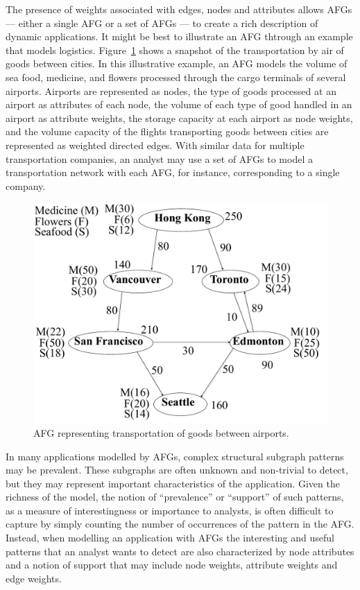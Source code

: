 The presence of weights associated with edges, nodes and attributes allows AFGs --- either a single AFG or a set of AFGs --- to create a rich description of dynamic applications. It might be best to illustrate an AFG thtrough an example that models logistics. Figure~\ref{fig:Airport} shows a snapshot of the transportation by air of goods between cities. In this illustrative example, an AFG models the volume of sea food, medicine, and flowers processed through the cargo terminals of several airports. Airports are represented as nodes, the type of goods processed at an airport as attributes of each node, the volume of each type of good handled in an airport as attribute weights, the storage capacity at each airport as node weights, and the volume capacity of the flights transporting goods between cities are represented as weighted directed edges. With similar data for multiple transportation companies, an analyst may use a set of AFGs to model a transportation network with each AFG, for instance, corresponding to a single company.  

\begin{figure}[h!]
\centering
  \includegraphics[scale=0.3]{figures/attributed_flow_graph_airport2.pdf}
    \caption{AFG representing transportation of goods between airports.}
    \label{fig:Airport}  
\end{figure}

In many applications modelled by AFGs, complex structural subgraph patterns may be prevalent. These subgraphs are often unknown and non-trivial to detect, but they may represent important characteristics of the application. Given the richness of the model, the notion of ``prevalence'' or ``support'' of such patterns, as a measure of interestingness or importance to analysts, is often difficult to capture by simply counting the number of occurrences of the pattern in the AFG. Instead, when modelling an application with AFGs the interesting and useful patterns that an analyst wants to detect are also characterized by node attributes and a notion of support that may include node weights, attribute weights and edge weights. 

